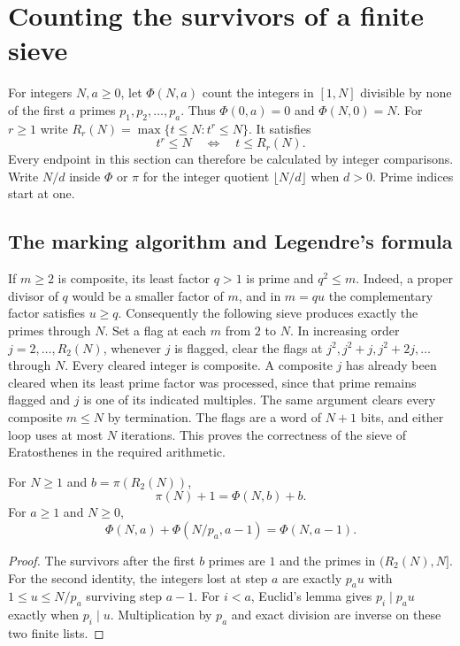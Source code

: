 \section{Counting the survivors of a finite sieve}
\label{sec:survivors}

For integers $N,a\ge0$, let $\Phi(N,a)$ count the integers in $[1,N]$ divisible by none of the first $a$ primes $p_1,p_2,\ldots,p_a$. Thus $\Phi(0,a)=0$ and $\Phi(N,0)=N$. For $r\ge1$ write $R_r(N)=\max\{t\le N:t^r\le N\}$. It satisfies
\[
 t^r\le N\quad\Longleftrightarrow\quad t\le R_r(N).
\]
Every endpoint in this section can therefore be calculated by integer comparisons. Write $N/d$ inside $\Phi$ or $\pi$ for the integer quotient $\lfloor N/d\rfloor$ when $d>0$. Prime indices start at one.

\subsection{The marking algorithm and Legendre's formula}

If $m\ge2$ is composite, its least factor $q>1$ is prime and $q^2\le m$. Indeed, a proper divisor of $q$ would be a smaller factor of $m$, and in $m=qu$ the complementary factor satisfies $u\ge q$. Consequently the following sieve produces exactly the primes through $N$. Set a flag at each $m$ from $2$ to $N$. In increasing order $j=2,\ldots,R_2(N)$, whenever $j$ is flagged, clear the flags at $j^2,j^2+j,j^2+2j,\ldots$ through $N$. Every cleared integer is composite. A composite $j$ has already been cleared when its least prime factor was processed, since that prime remains flagged and $j$ is one of its indicated multiples. The same argument clears every composite $m\le N$ by termination. The flags are a word of $N+1$ bits, and either loop uses at most $N$ iterations. This proves the correctness of the sieve of Eratosthenes in the required arithmetic.

\begin{proposition}
For $N\ge1$ and $b=\pi(R_2(N))$,
\[
 \pi(N)+1=\Phi(N,b)+b.
\]
For $a\ge1$ and $N\ge0$,
\[
 \Phi(N,a)+\Phi(N/p_a,a-1)=\Phi(N,a-1).
\]
\end{proposition}
\begin{proof}
The survivors after the first $b$ primes are $1$ and the primes in $(R_2(N),N]$. For the second identity, the integers lost at step $a$ are exactly $p_a u$ with $1\le u\le N/p_a$ surviving step $a-1$. For $i<a$, Euclid's lemma gives $p_i\mid p_a u$ exactly when $p_i\mid u$. Multiplication by $p_a$ and exact division are inverse on these two finite lists.
\end{proof}

